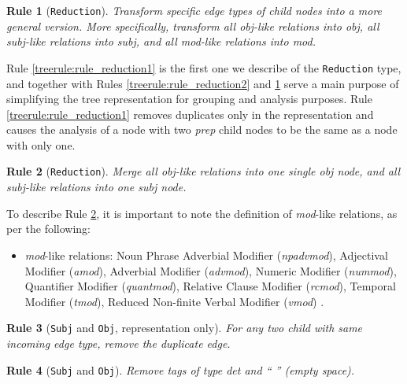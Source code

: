 \documentclass[11pt,a4paper,openright]{memoir}
\newtheorem{treerule}{Rule}
\begin{document}
\begin{treerule}[\texttt{Reduction}]
\label{treerule:rule_reduction3}
Transform specific edge types of child nodes into a more general version. More specifically, transform all \emph{obj}-like relations into \emph{obj}, all \emph{subj}-like relations into \emph{subj}, and all \emph{mod}-like relations into \emph{mod}.
\end{treerule}

Rule \ref{treerule:rule_reduction1} is the first one we describe of the \texttt{Reduction} type, and together with Rules  \ref{treerule:rule_reduction2} and \ref{treerule:rule_reduction3} serve a main purpose of simplifying the tree representation for grouping and analysis purposes. Rule \ref{treerule:rule_reduction1} removes duplicates only in the representation and causes the analysis of a node with two \emph{prep} child nodes to be the same as a node with only one.

\begin{treerule}[\texttt{Reduction}]
\label{treerule:rule_reduction4}
Merge all \emph{obj}-like relations into one single \emph{obj} node, and all \emph{subj}-like relations into one \emph{subj} node.
\end{treerule}

To describe Rule \ref{treerule:rule_reduction4}, it is important to note the definition of \emph{mod}-like relations, as per the following:
\begin{itemize}
  \item \emph{mod}-like relations: Noun Phrase Adverbial Modifier (\emph{npadvmod}), Adjectival Modifier (\emph{amod}), Adverbial Modifier (\emph{advmod}), Numeric Modifier (\emph{nummod}), Quantifier Modifier (\emph{quantmod}), Relative Clause Modifier (\emph{rcmod}), Temporal Modifier (\emph{tmod}), Reduced Non-finite Verbal Modifier (\emph{vmod}) \cite{Marneffe08stanfordtyped}.
\end{itemize}

\begin{treerule}[\texttt{Subj} and \texttt{Obj}, representation only]
\label{treerule:rule_subj1}
For any two child with same incoming edge type, remove the duplicate edge.
\end{treerule}

\begin{treerule}[\texttt{Subj} and \texttt{Obj}]
\label{treerule:rule_subj2}
Remove tags of type \emph{det} and \emph{\enquote{ }} (empty space).
\end{treerule}
\end{document}
